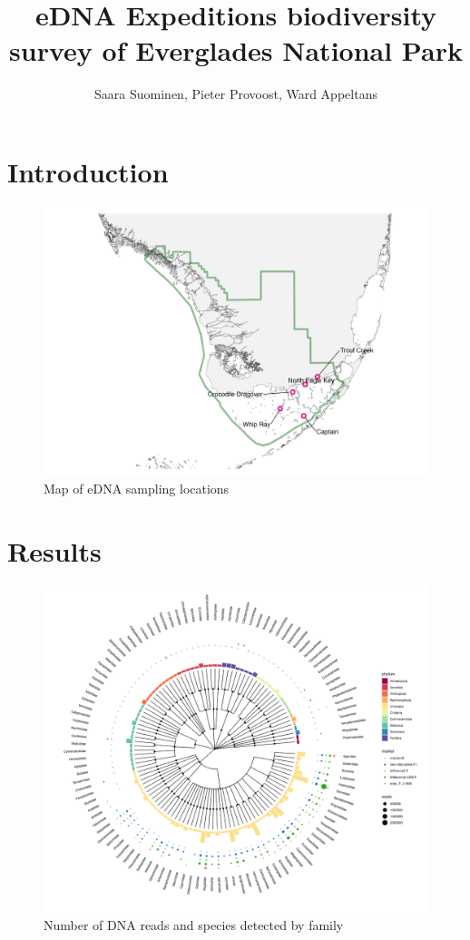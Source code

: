 \documentclass[10pt]{article}
\title{eDNA Expeditions biodiversity survey of Everglades National Park}
\author{Saara Suominen, Pieter Provoost, Ward Appeltans}
\begin{document}
\maketitle

\section{Introduction}

\begin{multicols}{2}
\blindtext
\blindtext
\end{multicols}

\begin{figure}[h]
\centering
\includegraphics[width=\textwidth]{map}
\caption{Map of eDNA sampling locations}
\end{figure}

\section{Results}

\begin{figure}[h!]
\centering
\includegraphics[width=\textwidth]{tree}
\caption{Number of DNA reads and species detected by family}
\end{figure}
\end{document}
